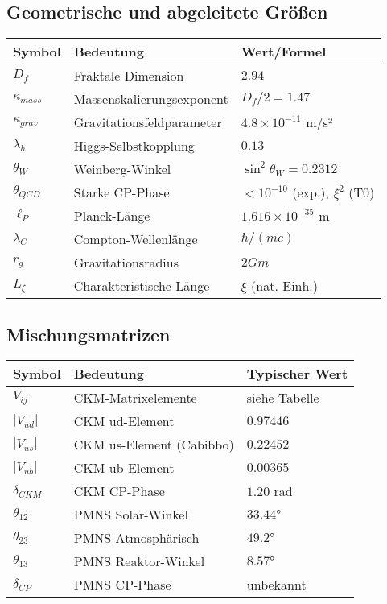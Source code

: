 \documentclass[12pt,a4paper]{article}
\theoremstyle{definition}
\begin{document}
\subsection{Geometrische und abgeleitete Größen}
\begin{longtable}{lll}
	\toprule
	\textbf{Symbol} & \textbf{Bedeutung} & \textbf{Wert/Formel} \\
	\midrule
	$D_f$ & Fraktale Dimension & $2.94$ \\
	$\kappa_{mass}$ & Massenskalierungsexponent & $D_f/2 = 1.47$ \\
	$\kappa_{grav}$ & Gravitationsfeldparameter & $4.8 \times 10^{-11}$ m/s² \\
	$\lambda_h$ & Higgs-Selbstkopplung & $0.13$ \\
	$\theta_W$ & Weinberg-Winkel & $\sin^2\theta_W = 0.2312$ \\
	$\theta_{QCD}$ & Starke CP-Phase & $< 10^{-10}$ (exp.), $\xi^2$ (T0) \\
	$\ell_P$ & Planck-Länge & $1.616 \times 10^{-35}$ m \\
	$\lambda_C$ & Compton-Wellenlänge & $\hbar/(mc)$ \\
	$r_g$ & Gravitationsradius & $2Gm$ \\
	$L_\xi$ & Charakteristische Länge & $\xi$ (nat. Einh.) \\
	\bottomrule
\end{longtable}

\subsection{Mischungsmatrizen}
\begin{longtable}{lll}
	\toprule
	\textbf{Symbol} & \textbf{Bedeutung} & \textbf{Typischer Wert} \\
	\midrule
	$V_{ij}$ & CKM-Matrixelemente & siehe Tabelle \\
	$|V_{ud}|$ & CKM ud-Element & $0.97446$ \\
	$|V_{us}|$ & CKM us-Element (Cabibbo) & $0.22452$ \\
	$|V_{ub}|$ & CKM ub-Element & $0.00365$ \\
	$\delta_{CKM}$ & CKM CP-Phase & $1.20$ rad \\
	$\theta_{12}$ & PMNS Solar-Winkel & $33.44°$ \\
	$\theta_{23}$ & PMNS Atmosphärisch & $49.2°$ \\
	$\theta_{13}$ & PMNS Reaktor-Winkel & $8.57°$ \\
	$\delta_{CP}$ & PMNS CP-Phase & unbekannt \\
	\bottomrule
\end{longtable}
\end{document}
